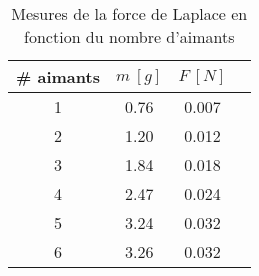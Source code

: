 \documentclass[11pt]{article}
\begin{document}
    \begin{minipage}{.45\textwidth}
        \begin{table}[H]
            \centering
            \begin{tabular}{|c|c|c|c|}
                \hline
                \rowcolor{gray} \# aimants & $m \ [g]$ & $F \ [N]$ \\
                \hline
                1 & 0.76 & 0.007 \\
                \hline
                2 & 1.20 & 0.012 \\
                \hline
                3 & 1.84 & 0.018 \\
                \hline
                4 & 2.47 & 0.024 \\
                \hline
                5 & 3.24 & 0.032 \\
                \hline
                6 & 3.26 & 0.032 \\
                \hline
            \end{tabular}
            \caption{Mesures de la force de Laplace en fonction du nombre d'aimants}
            \label{tab:mesure-aimants}
        \end{table}
    \end{minipage}\\
\end{document}
